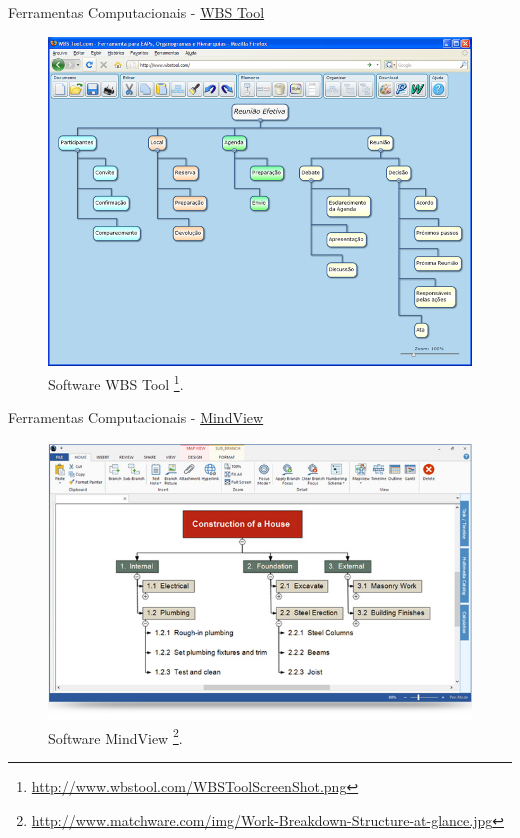 \documentclass[xcolor=dvipsnames]{beamer}
\begin{document}

\begin{frame}{Ferramentas Computacionais - \href{http://www.wbstool.com/}{WBS Tool}}

	\begin{figure}[H]
    
     	\centering
        \label{fig:taskarchitect}
        \includegraphics[width=0.68\linewidth]{img/WBSToolScreenShot.png}
        \caption{Software WBS Tool \footnote{\url{http://www.wbstool.com/WBSToolScreenShot.png}}.}
        
	\end{figure}
    
\end{frame}



\begin{frame}{Ferramentas Computacionais - \href{http://www.matchware.com/en/products/mindview/mindview2_be/wbs.htm}{MindView}}

	\begin{figure}[H]
    
     	\centering
        \label{fig:taskarchitect}
        \includegraphics[width=0.8\linewidth]{img/mindview.jpg}
        \caption{Software MindView \footnote{\url{http://www.matchware.com/img/Work-Breakdown-Structure-at-glance.jpg}}.}
        
	\end{figure}
    
\end{frame}
\end{document}
